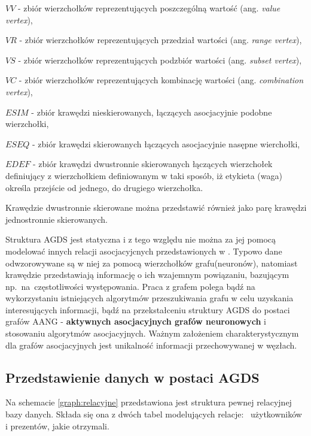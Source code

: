 \begin{description}
    \item \(VV\) - zbiór wierzchołków reprezentujących poszczególną wartość (ang. \emph{value vertex}),
    \item \(VR\) - zbiór wierzchołków reprezentujących przedział wartości (ang. \emph{range vertex}),
    \item \(VS\) - zbiór wierzchołków reprezentujących podzbiór wartości (ang. \emph{subset vertex}),
    \item \(VC\) - zbiór wierzchołków reprezentujących kombinację wartości (ang. \emph{combination vertex}),
    \item \(ESIM\) - zbiór krawędzi nieskierowanych, łączących asocjacyjnie podobne wierzchołki,
    \item \(ESEQ\) - zbiór krawędzi skierowanych łączących asocjacyjnie nasępne wierchołki,
    \item \(EDEF\) - zbiór krawędzi dwustronnie skierowanych łączących wierzchołek definiujący z wierzchołkiem definiowanym w taki sposób,
                     iż etykieta (waga) określa przejście od jednego, do drugiego wierzchołka.
\end{description}

Krawędzie dwustronnie skierowane można przedstawić również jako parę krawędzi jednostronnie skierowanych.

Struktura AGDS jest statyczna i z tego względu nie można za jej pomocą modelować innych relacji asocjacyjcnych przedstawionych w \cite{Horzyk}.
Typowo dane odwzorowywane są w niej za pomocą wierzchołków grafu(neuronów), natomiast krawędzie przedstawiają informację o ich wzajemnym powiązaniu, bazującym np.~na~częstotliwości
występowania. Praca z grafem polega bądź na wykorzystaniu istniejących algorytmów przeszukiwania grafu w celu uzyskania interesujących informacji, bądź
na przekstałceniu struktury AGDS do postaci grafów AANG - \textbf{aktywnych asocjacyjnych grafów neuronowych} i stosowaniu algorytmów asocjacyjnych.
Ważnym założeniem charakterystycznym dla grafów asocjacyjnych jest unikalność informacji przechowywanej w węzłach. 

\subsection{Przedstawienie danych w postaci AGDS}
Na schemacie \ref{graph:relacyjne} przedstawiona jest struktura pewnej relacyjnej bazy danych. Składa się ona z dwóch tabel modelujących relacje:~
użytkowników i prezentów, jakie otrzymali. 

